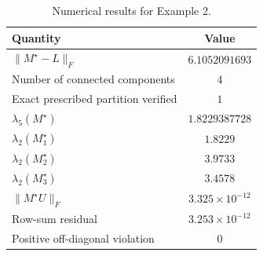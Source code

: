 \documentclass[11pt]{article}
\begin{document}
\begin{table}[H]
	\centering
	\caption{Numerical results for Example 2.}
	\label{tab:example1}
	\begin{tabular}{lc}
		\hline
		Quantity & Value \\
		\hline
		$\|M^\star-L\|_F$ & $6.1052091693$ \\
		Number of connected components & $4$ \\
		Exact prescribed partition verified & $1$ \\
		$\lambda_5(M^\star)$ & $1.8229387728$ \\
		$\lambda_2(M^\star_1)$ & $1.8229$ \\
		$\lambda_2(M^\star_2)$ & $3.9733$ \\
		$\lambda_2(M^\star_3)$ & $3.4578$ \\
		$\|M^\star U\|_F$ & $3.325\times 10^{-12}$ \\
		Row-sum residual & $3.253\times 10^{-12}$ \\
		Positive off-diagonal violation & $0$ \\
		\hline
	\end{tabular}
\end{table}



	
	
	
\end{document}
